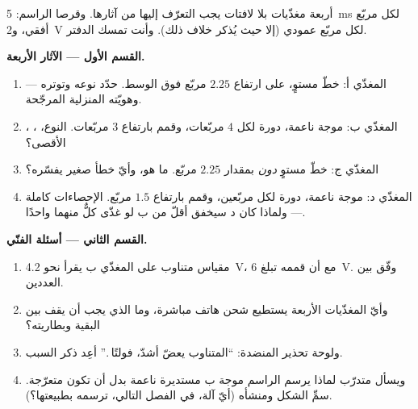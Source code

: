 \begin{problem}\label{pb:g9:alternating-current:1}
أربعة مغذّيات بلا لافتات يجب التعرّف إليها من آثارها. وقرصا
الراسم: \qty{5}{ms} لكل مربّع أفقي، و\qty{2}{V} لكل مربّع
عمودي (إلا حيث يُذكر خلاف ذلك). وأنت تمسك الدفتر.

\medskip\noindent\textbf{القسم الأول --- الآثار الأربعة.}
\begin{enumerate}
  \item المغذّي أ: خطّ مستوٍ، على ارتفاع $2.25$ مربّع فوق
        الوسط. حدّد نوعه وتوتره --- وهويّته المنزلية
        المرجّحة.
  \item المغذّي ب: موجة ناعمة، دورة لكل $4$ مربّعات، وقمم
        بارتفاع $3$ مربّعات. النوع، ، ،
         الأقصى؟
  \item المغذّي ج: خطّ مستوٍ \emph{دون}  بمقدار $2.25$
        مربّع. ما هو، وأيّ خطأ صغير يفسّره؟
  \item المغذّي د: موجة ناعمة، دورة لكل مربّعين، وقمم بارتفاع
        $1.5$ مربّع. الإحصاءات كاملة --- ولماذا كان  د
        سيخفق أقلّ من  ب لو غذّى كلٌّ منهما واحدًا.
\end{enumerate}

\medskip\noindent\textbf{القسم الثاني --- أسئلة الفنّي.}
\begin{enumerate}[resume]
  \item مقياس  متناوب على المغذّي ب يقرأ نحو
        \qty{4.2}{V}، مع أن قممه تبلغ \qty{6}{V}. وفّق بين
        العددين.
  \item وأيّ المغذّيات الأربعة يستطيع شحن هاتف مباشرة، وما
        الذي يجب أن يقف بين البقية وبطاريته؟
  \item ولوحة تحذير المنضدة: ``المتناوب يعضّ أشدّ، فولتًا
        .'' أعِد ذكر السبب.
  \item ويسأل متدرّب لماذا يرسم الراسم موجة ب مستديرة ناعمة
        بدل أن تكون متعرّجة. سمِّ الشكل ومنشأه (أيّ آلة، في
        الفصل التالي، ترسمه بطبيعتها؟).
\end{enumerate}


\end{problem}
